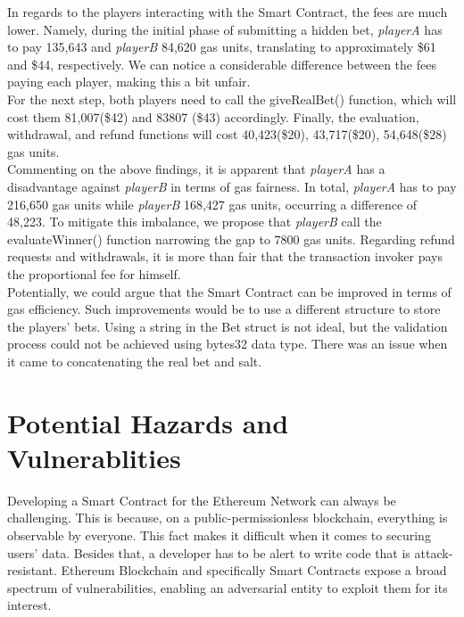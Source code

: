 \documentclass[12pt,a4paper]{article}
\begin{document}
In regards to the players interacting with the Smart Contract, the fees are much lower.
Namely, during the initial phase of submitting a hidden bet, \emph{playerA} has to pay 135,643
and \emph{playerB} 84,620 gas units, translating to approximately \$61 and \$44, respectively.
We can notice a considerable difference between the fees paying each player, making this a bit unfair. \\

For the next step, both players need to call the giveRealBet() function, which will cost
them 81,007(\$42) and  83807 (\$43) accordingly. Finally, the evaluation, withdrawal, and
refund functions will cost 40,423(\$20), 43,717(\$20), 54,648(\$28) gas units.  \\

Commenting on the above findings, it is apparent that \emph{playerA} has a disadvantage against \emph{playerB}
in terms of gas fairness. In total, \emph{playerA} has to pay 216,650 gas units while \emph{playerB} 168,427
gas units, occurring a difference of 48,223. To mitigate this imbalance, we propose that \emph{playerB}
call the evaluateWinner() function narrowing the gap to 7800 gas units. Regarding refund
requests and withdrawals, it is more than fair that the transaction invoker pays the proportional
fee for himself. \\

Potentially, we could argue that the Smart Contract can be improved in terms of gas efficiency.
Such improvements would be to use a different structure to store the players' bets. Using a string
in the Bet struct is not ideal, but the validation process could not be achieved using bytes32 data type.
There was an issue when it came to concatenating the real bet and salt.

\section*{Potential Hazards and Vulnerablities}

Developing a Smart Contract for the Ethereum Network can always be challenging.
This is because, on a public-permissionless blockchain, everything is observable by everyone.
This fact makes it difficult when it comes to securing users' data. Besides that, a developer
has to be alert to write code that is attack-resistant. Ethereum Blockchain and specifically
Smart Contracts expose a broad spectrum of vulnerabilities, enabling an adversarial entity to
exploit them for its interest. \\
\end{document}
